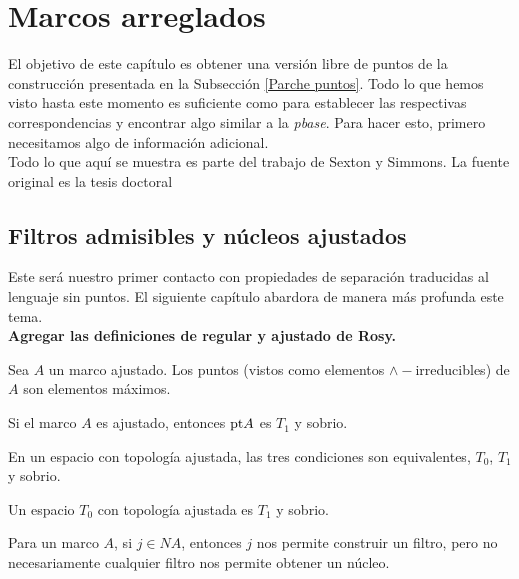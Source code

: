 \chapter{Marcos arreglados}\label{Parches}

El objetivo de este capítulo es obtener una versión libre de puntos de la construcción presentada en la Subsección \ref{Parche puntos}. 
Todo lo que hemos visto hasta este momento es suficiente como para establecer las respectivas correspondencias y encontrar algo similar 
a la \emph{pbase}. Para hacer esto, primero necesitamos algo de información adicional.\\

Todo lo que aquí se muestra es parte del trabajo de Sexton y Simmons. La fuente original es la tesis doctoral \cite{R.S.}

\section{Filtros admisibles y núcleos ajustados}
Este será nuestro primer contacto con propiedades de separación traducidas al lenguaje sin puntos. El siguiente capítulo abardora de manera 
más profunda este tema.\\ 

\textbf{Agregar las definiciones de regular y ajustado de Rosy.}

\begin{lem}
    Sea $A$ un marco ajustado. Los puntos (vistos como elementos $\wedge-$irreducibles) de $A$ son elementos máximos.
\end{lem}

\begin{lem}
    Si el marco $A$ es ajustado, entonces $\mathrm{pt} A$ es $T_1$ y sobrio.
\end{lem}

\begin{lem}
    En un espacio con topología ajustada, las tres condiciones son equivalentes, $T_0$, $T_1$ y sobrio.
\end{lem}

\begin{cor}
    Un espacio $T_0$ con topología ajustada es $T_1$ y sobrio.
\end{cor}

Para un marco $A$, si $j\in NA$, entonces $j$ nos permite construir un filtro, pero no necesariamente cualquier filtro nos permite obtener un núcleo.

